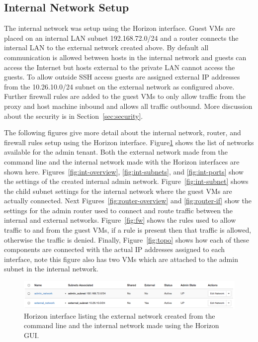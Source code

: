 \subsection{Internal Network Setup}
\label{openstack-int}
The internal network was setup using the Horizon interface. Guest VMs
are placed on an internal LAN subnet 192.168.72.0/24 and a router
connects the internal LAN to the external network created above. By
default all communication is allowed between hosts in the internal
network and guests can access the Internet but hosts external to the
private LAN cannot access the guests. To allow outside SSH access guests
are assigned external IP addresses from the 10.26.10.0/24 subnet on the
external network as configured above. Further firewall rules are added
to the guest VMs to only allow traffic from the proxy and host machine
inbound and allows all traffic outbound. More discussion about the
security is in Section~\ref{sec:security}.

The following figures give more detail about the internal network,
router, and firewall rules setup using the Horizon interface.
Figure\ref{fig:net-list} shows the list of networks available for the
admin tenant. Both the external network made from the command line and
the internal network made with the Horizon interfaces are shown here.
Figures~\ref{fig:int-overview}, \ref{fig:int-subnets}, and
\ref{fig:int-ports} show the settings of the created internal admin
network. Figure~\ref{fig:int-subnet} shows the child subnet settings for
the internal network where the guest VMs are actually connected. Next
Figures~\ref{fig:router-overview} and \ref{fig:router-if} show the
settings for the admin router used to connect and route traffic between
the internal and external networks. Figure~\ref{fig:fw} shows the rules
used to allow traffic to and from the guest VMs, if a rule is present
then that traffic is allowed, otherwise the traffic is denied. Finally,
Figure~\ref{fig:topo} shows how each of these components are connected
with the actual IP addresses assigned to each interface, note this
figure also has two VMs which are attached to the admin subnet in the
internal network.

\begin{figure}[H]
  \centering
  \includegraphics[scale=0.40]{img/network-netlist}
  \caption{Horizon interface listing the external network created from
the command line and the internal network made using the Horizon GUI.}
  \label{fig:net-list}
\end{figure}

